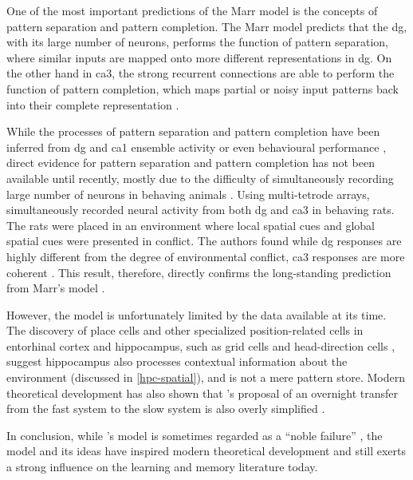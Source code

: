 One of the most important predictions of the Marr model \citep{marr71} is the concepts of pattern separation and pattern completion. The Marr model predicts that the \gls{dg}, with its large number of neurons, performs the function of pattern separation, where similar inputs are mapped onto more different representations in \gls{dg}. On the other hand in \gls{ca3}, the strong recurrent connections are able to perform the function of pattern completion, which maps partial or noisy input patterns back into their complete representation \citep{rolls13, knierim16}. 

While the processes of pattern separation and pattern completion have been inferred from \gls{dg} and \gls{ca1} ensemble activity or even behavioural performance \citep{santoro13, rolls13}, direct evidence for  pattern separation and pattern completion has not been available until recently, mostly due to the difficulty of simultaneously recording large number of neurons in behaving animals \citep{knierim16}. Using multi-tetrode arrays, \citet{neunuebel14} simultaneously recorded neural activity from both \gls{dg} and \gls{ca3} in behaving rats. The rats were placed in an environment where local spatial cues and global spatial cues were presented in conflict. The authors found while \gls{dg} responses are highly different from the degree of environmental conflict, \gls{ca3} responses are more coherent \citep{neunuebel14}. This result, therefore, directly confirms the long-standing prediction from Marr's model \citep{rolls13, knierim16}. 

However, the \citet{marr71} model is unfortunately limited by the data available at its time. The discovery of place cells \citep{o'keefe71} and other specialized position-related cells in entorhinal cortex and hippocampus, such as grid cells and head-direction cells \citep{taube90, fyhn04, hafting05}, suggest hippocampus also processes contextual information about the environment (discussed in \ref{hpc-spatial}), and is not a mere pattern store. Modern theoretical development has also shown that \citet{marr71}'s proposal of an overnight transfer from the fast system to the slow system is also overly simplified \citep{squire09}. 

In conclusion, while \citet{marr71}'s model is sometimes regarded as a ``noble failure'' \citep{willshaw15}, the model and its ideas have inspired modern theoretical development and still exerts a strong influence on the learning and memory literature today. 


